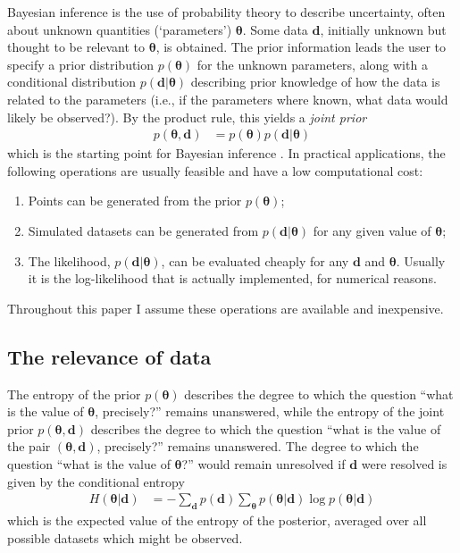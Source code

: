 \documentclass[entropy,article,accept,oneauthor,pdftex,10pt,a4paper]{mdpi}
\renewcommand{\d}{\boldsymbol{d}}
\newcommand{\x}{\boldsymbol{\theta}}
\begin{document}
Bayesian inference is the use of probability theory to
describe uncertainty, often about unknown quantities
(`parameters') $\x$. Some data $\d$, initially unknown but
thought to be relevant to $\x$, is obtained.
The prior information leads the
user to specify a prior distribution $p(\x)$ for the unknown parameters,
along with a conditional distribution $p(\d | \x)$ describing prior knowledge
of how the data is related to the parameters
(i.e., if the parameters where known, what data would likely be observed?).
By the product rule, this yields a {\em joint prior}
\begin{align}
p(\x, \d) &= p(\x)p(\d | \x)
\end{align}
which is the starting point for
Bayesian inference \citep{caticha2008lectures, caticha2006updating}.
In practical applications, the following operations
are usually feasible and have a low computational cost:
\begin{enumerate}
  \item Points can be generated from the prior $p(\x)$;
  \item Simulated datasets can be generated from $p(\d | \x)$ for any
        given value of $\x$;
  \item The likelihood, $p(\d | \x)$, can be evaluated cheaply for any
        $\d$ and $\x$. Usually it is the log-likelihood that is actually
        implemented, for numerical reasons.
\end{enumerate}
Throughout this paper I assume these operations are available and inexpensive.

\subsection{The relevance of data}

The entropy of the prior $p(\x)$ describes the degree to which the question
``what is the value of $\x$, precisely?'' remains unanswered, while the
entropy of the joint prior $p(\x, \d)$
describes the degree to which the question
``what is the value of the pair $(\x, \d)$, precisely?'' remains unanswered.
The degree to which the question ``what is the value of $\x$?'' would remain
unresolved if $\d$ were resolved is given by the
conditional entropy
\begin{align}
H(\x | \d) &= - \sum_{\d} p(\d) \sum_{\x} p(\x | \d) \log p(\x | \d)
\end{align}
which is the expected value of the entropy of the posterior, averaged over
all possible datasets which might be observed. 
\end{document}
